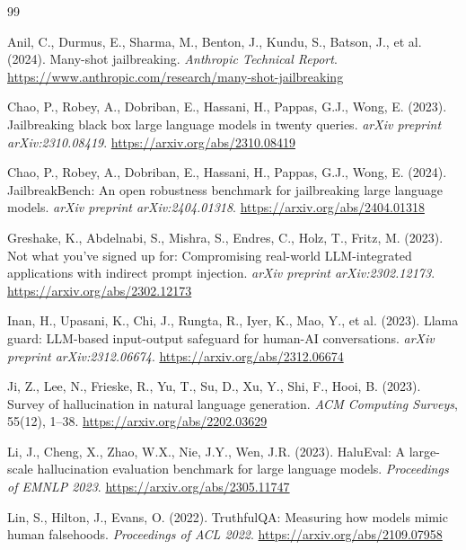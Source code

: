 \documentclass[preprint,12pt,authoryear]{elsarticle}
\begin{document}
\begin{thebibliography}{99}

Anil, C., Durmus, E., Sharma, M., Benton, J., Kundu, S., Batson, J.,
et al. (2024).
Many-shot jailbreaking.
\textit{Anthropic Technical Report}.
\url{https://www.anthropic.com/research/many-shot-jailbreaking}

Chao, P., Robey, A., Dobriban, E., Hassani, H., Pappas, G.J., Wong, E. (2023).
Jailbreaking black box large language models in twenty queries.
\textit{arXiv preprint arXiv:2310.08419}.
\url{https://arxiv.org/abs/2310.08419}

Chao, P., Robey, A., Dobriban, E., Hassani, H., Pappas, G.J., Wong, E. (2024).
JailbreakBench: An open robustness benchmark for jailbreaking large language models.
\textit{arXiv preprint arXiv:2404.01318}.
\url{https://arxiv.org/abs/2404.01318}

Greshake, K., Abdelnabi, S., Mishra, S., Endres, C., Holz, T., Fritz, M. (2023).
Not what you've signed up for: Compromising real-world LLM-integrated applications with indirect prompt injection.
\textit{arXiv preprint arXiv:2302.12173}.
\url{https://arxiv.org/abs/2302.12173}

Inan, H., Upasani, K., Chi, J., Rungta, R., Iyer, K., Mao, Y., et al. (2023).
Llama guard: LLM-based input-output safeguard for human-AI conversations.
\textit{arXiv preprint arXiv:2312.06674}.
\url{https://arxiv.org/abs/2312.06674}

Ji, Z., Lee, N., Frieske, R., Yu, T., Su, D., Xu, Y., Shi, F., Hooi, B. (2023).
Survey of hallucination in natural language generation.
\textit{ACM Computing Surveys}, 55(12), 1--38.
\url{https://arxiv.org/abs/2202.03629}

Li, J., Cheng, X., Zhao, W.X., Nie, J.Y., Wen, J.R. (2023).
HaluEval: A large-scale hallucination evaluation benchmark for large language models.
\textit{Proceedings of EMNLP 2023}.
\url{https://arxiv.org/abs/2305.11747}

Lin, S., Hilton, J., Evans, O. (2022).
TruthfulQA: Measuring how models mimic human falsehoods.
\textit{Proceedings of ACL 2022}.
\url{https://arxiv.org/abs/2109.07958}


\end{thebibliography}
\end{document}
